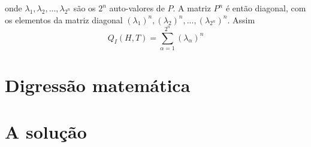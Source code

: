 onde $\lambda_{1},\lambda_{2},...,\lambda_{2^{n}}$ s\~ao os $2^{n}$ auto-valores de $P$. A matriz $P^{n}$ \'e ent\~ao diagonal, com os elementos da matriz diagonal $(\lambda_{1})^{n},(\lambda_{2})^{n},...,(\lambda_{2^{n}})^{n}$. Assim
\begin{equation}
Q_{I}(H,T)=\sum_{\alpha=1}^{2^{n}}(\lambda_{\alpha})^{n}
\end{equation}


\section{Digress\~ao matem\'atica}
\noindent

\section{A solu\c{c}\~ao}
\noindent